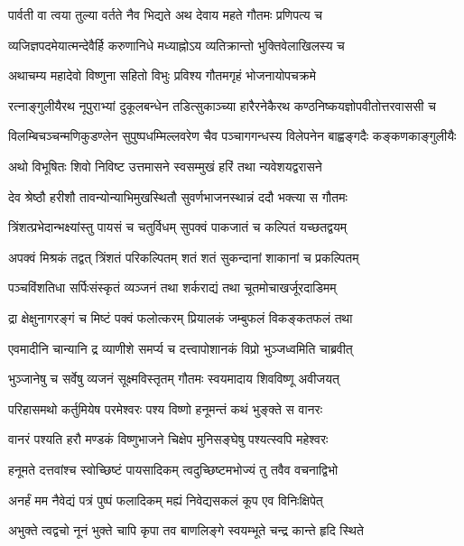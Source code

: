 \twolineshloka
{पार्वती वा त्वया तुल्या वर्तते नैव भिद्यते}
{अथ देवाय महते गौतमः प्रणिपत्य च}%

\twolineshloka
{व्यजिज्ञपदमेयात्मन्देवैर्हि करुणानिधे}
{मध्याह्नोऽय व्यतिक्रान्तो भुक्तिवेलाखिलस्य च}%

\twolineshloka
{अथाचम्य महादेवो विष्णुना सहितो विभुः}
{प्रविश्य गौतमगृहं भोजनायोपचक्रमे}%

\twolineshloka
{रत्नाङ्गुलीयैरथ नूपुराभ्यां दुकूलबन्धेन तडित्सुकाञ्च्या}
{हारैरनेकैरथ कण्ठनिष्कयज्ञोपवीतोत्तरवाससी च}%

\twolineshloka
{विलम्बिचञ्चन्मणिकुडण्लेन सुपुष्पधम्मिल्लवरेण चैव}
{पञ्चागगन्धस्य विलेपनेन बाह्वङ्गदैः कङ्कणकाङ्गुलीयैः}%

\twolineshloka
{अथो विभूषितः शिवो निविष्ट उत्तमासने}
{स्वसम्मुखं हरिं तथा न्यवेशयद्वरासने}%

\twolineshloka
{देव श्रेष्ठौ हरीशौ तावन्योन्याभिमुखस्थितौ}
{सुवर्णभाजनस्थान्नं ददौ भक्त्या स गौतमः}%

\twolineshloka
{त्रिंशत्प्रभेदान्भक्ष्यांस्तु पायसं च चतुर्विधम्}
{सुपक्वं पाकजातं च कल्पितं यच्छतद्वयम्}%

\twolineshloka
{अपक्वं मिश्रकं तद्वत् त्रिंशतं परिकल्पितम्}
{शतं शतं सुकन्दानां शाकानां च प्रकल्पितम्}%

\twolineshloka
{पञ्चविंशतिधा सर्पिःसंस्कृतं व्यञ्जनं तथा}
{शर्कराद्यं तथा चूतमोचाखर्जूरदाडिमम्}%

\twolineshloka
{द्रा क्षेक्षुनागरङ्गं च मिष्टं पक्वं फलोत्करम्}
{प्रियालकं जम्बुफलं विकङ्कतफलं तथा}%

\twolineshloka
{एवमादीनि चान्यानि द्र व्याणीशे समर्प्य च}
{दत्त्वापोशानकं विप्रो भुञ्जध्वमिति चाब्रवीत्}%

\twolineshloka
{भुञ्जानेषु च सर्वेषु व्यजनं सूक्ष्मविस्तृतम्}
{गौतमः स्वयमादाय शिवविष्णू अवीजयत्}%

\twolineshloka
{परिहासमथो कर्तुमियेष परमेश्वरः}
{पश्य विष्णो हनूमन्तं कथं भुङ्क्ते स वानरः}%

\twolineshloka
{वानरं पश्यति हरौ मण्डकं विष्णुभाजने}
{चिक्षेप मुनिसङ्घेषु पश्यत्स्वपि महेश्वरः}%

\twolineshloka
{हनूमते दत्तवांश्च स्वोच्छिष्टं पायसादिकम्}
{त्वदुच्छिष्टमभोज्यं तु तवैव वचनाद्विभो}%

\twolineshloka
{अनर्हं मम नैवेद्यं पत्रं पुष्पं फलादिकम्}
{मह्यं निवेद्यसकलं कूप एव विनिःक्षिपेत्}%

\twolineshloka
{अभुक्ते त्वद्वचो नूनं भुक्ते चापि कृपा तव}
{बाणलिङ्गे स्वयम्भूते चन्द्र कान्ते हृदि स्थिते}%

